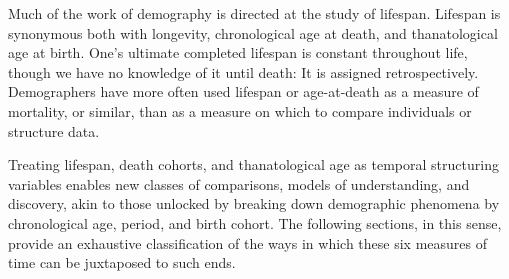 \documentclass[12pt,oneside,a4paper]{article} %
\theoremstyle{definition}
\begin{document}

Much of the work of demography is directed at the study of lifespan. Lifespan is
synonymous both with longevity, chronological age at death, and thanatological
age at birth. One's ultimate completed lifespan is constant throughout life,
though we have no knowledge of it until death: It is assigned retrospectively.
Demographers have more often used lifespan or age-at-death as a measure of
mortality, or similar, than as a measure on which to compare individuals or
structure data.

Treating lifespan,
death cohorts, and thanatological age as temporal structuring variables
enables new classes of comparisons, models of understanding, and discovery,
akin to those unlocked by breaking down demographic phenomena by chronological age,
period, and birth cohort. The following sections, in this sense, provide an
exhaustive classification of the ways in which these six measures of time can be juxtaposed to such ends.
\end{document}

